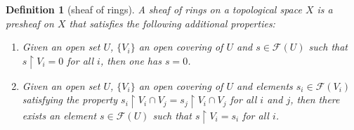 \documentclass[12pt]{scrartcl}
\newtheorem{definition}[proposition]{Definition}
\begin{document}
\begin{definition}[sheaf of rings]
	A sheaf of rings on a topological space $X$ is a presheaf on $X$ that satisfies the following additional properties:
	\begin{enumerate}
		\item[(locality)] Given an open set $U$, $\lbrace V_i \rbrace$ an open covering of $U$ and $s \in \mathscr{F}(U)$ such that $s \restriction V_i = 0$ for all $i$, then one has $s = 0$.
		\item[(glueing)] Given an open set $U$, $\lbrace V_i \rbrace$ an open covering of $U$ and elements $s_i \in \mathscr{F}(V_i)$ satisfying the property $s_i \restriction V_i \cap V_j = s_j \restriction V_i \cap V_j$ for all $i$ and $j$, then there exists an element $s \in \mathscr{F}(U)$ such that $s \restriction V_i = s_i$ for all $i$.  
	\end{enumerate}	
\end{definition}
\end{document}
